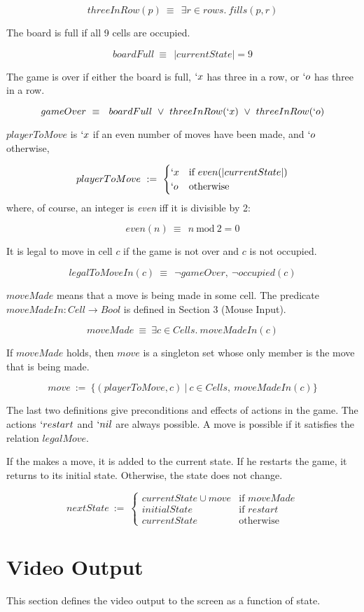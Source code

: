 \documentclass[a4paper]{article}
\newcommand{\defun}[2] {$$ #1\ :=\ #2$$}
\newcommand{\defpred}[2]{ $$ #1\ \equiv\ #2$$}
\newcommand{\caseif}[2] {#1 & \text{if } #2 \\}
\newcommand{\caseow}[1] {#1 & \text{otherwise }}
\newcommand{\MOD} {\ \text{mod}\ }
\begin{document}
\defpred{threeInRow(p)} {\ \exists r\in rows.\ fills(p,r)}

\bigskip\noindent
The board is full if all 9 cells are occupied. 

\defpred{boardFull}{\ |currentState| = 9}

\bigskip\noindent
The game is over if either the board is full,  $`x$ has  three in a row, or $`o$ has three in a row.

\defpred{gameOver} {\ boardFull\ \vee\ threeInRow(`x)\ \vee\ threeInRow(`o)}

\bigskip\noindent
$playerToMove$ is $`x$ if an even number of moves have been made, and $`o$ otherwise,

\defun{playerToMove}
{\begin{cases}
    \caseif{`x}{even(|currentState|)}
    \caseow{`o}
 \end{cases}
}
where, of course, an integer is {\it even} iff it is divisible by 2:

\defpred{even(n)}{\ n \MOD 2 = 0}

\bigskip\noindent
It is legal to move in cell $c$ if the game is not over and $c$ is not occupied.

\defpred {legalToMoveIn(c)} {\ \lnot gameOver,\ \lnot occupied(c)}


\bigskip\noindent
$moveMade$ means that a move is being made in some cell. The predicate $moveMadeIn:Cell\rightarrow Bool$ is defined in Section 3 (Mouse Input). 

\defpred{moveMade}{\exists c \in Cells.\ moveMadeIn(c)}


\bigskip\noindent
If $moveMade$ holds, then $move$ is a singleton set whose only
member is the move that is being made.

\defun{move}
{\{(playerToMove,c)\ |\ c \in Cells,\ moveMadeIn(c)\}}

\bigskip\noindent
The last two definitions give  preconditions and effects of actions in the game. The actions $`restart$ and $`nil$ are always possible. A move is possible if it satisfies the relation $legalMove$.

\bigskip\noindent
If the makes a move, it is added to the current state. If he restarts the game, it returns to its initial state. Otherwise, the state does not change.

\defun{nextState}
{\begin{cases}
\caseif{currentState \cup move} {moveMade}
\caseif{initialState} {restart}
\caseow{currentState}
\end{cases}
}




\section{Video Output}

This section defines the video output to the screen as a function of state. 
\end{document}
